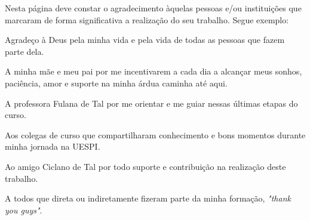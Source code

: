 \begin{agradecimentos}
\ABNTEXchapterfont
Nesta página deve constar o agradecimento àquelas pessoas e/ou instituições que marcaram de forma significativa a realização do seu trabalho. Segue exemplo:

Agradeço à Deus pela minha vida e pela vida de todas as pessoas que fazem parte dela.

A minha mãe e meu pai por me incentivarem a cada dia a alcançar meus sonhos, paciência, amor e suporte na minha árdua caminha até aqui.

A professora Fulana de Tal por me orientar e me guiar nessas últimas etapas do curso.

Aos colegas de curso que compartilharam conhecimento e bons momentos durante minha jornada na UESPI.

Ao amigo Ciclano de Tal por todo suporte e contribuição na realização deste trabalho.

A todos que direta ou indiretamente fizeram parte da minha formação, \textit{"thank you guys"}.

\end{agradecimentos}
